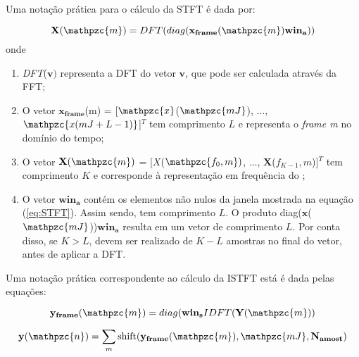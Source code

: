        Uma notação prática para o cálculo da STFT é dada por:


        \begin{equation}\label{eq:practiceSTFT}
            \mathbf{X}(\mathpzc{m})
            = DFT(diag(\mathbf{x_{frame}}(\mathpzc{m})\mathbf{win_a}))
         \end{equation}
         onde 
        \begin{enumerate}
        
            \item \textit{DFT}($\mathbf{v})$ representa a DFT do vetor $\mathbf{v}$, que pode ser calculada através da FFT;
            
            \item O vetor $\mathbf{x_{frame}}$(m) = [$\mathpzc{x}$($\mathpzc{mJ}$), $\dots$, $\mathpzc{x(mJ + L - 1)}$]$^T$ tem comprimento $L$ e representa o \textit{frame m} no domínio do tempo;
            
            \item O vetor $\mathbf{X}(\mathpzc{m})$ = [${X}$($\mathpzc{f_0,m})$, $\dots$, $\mathbf{X}$(${f_{K-1},m}$)]$^T$ tem comprimento $K$ e corresponde à representação em
            frequência do ;
            
            \item O vetor $\mathbf{win_a}$ contém os elementos não nulos da janela mostrada na equação (\ref{eq:STFT}). Assim sendo, tem comprimento $L$. O produto diag($\mathbf{x}$($\mathpzc{mJ}$))$\mathbf{win_a}$ resulta em um vetor de comprimento $L$. Por conta disso, se $K>L$, devem ser realizado  de $K-L$ amostras no final do vetor, antes de aplicar a DFT.
        
        \end{enumerate}
        
        Uma notação prática correspondente ao cálculo da ISTFT está é dada pelas equações:
        
        \begin{equation}\label{eq:practiceISTFT}
            \mathbf{y_{frame}}(\mathpzc{m})
            = diag(\mathbf{win_s}IDFT(\mathbf{Y}(\mathpzc{m}))
         \end{equation}
        
        \begin{equation}\label{eq:practiceISTFT2}
            \mathbf{y}(\mathpzc{n})
            = \sum_{m}\text{shift}(\mathbf{y_{frame}}(\mathpzc{m}),\mathpzc{mJ},\mathbf{N_{amost}})
         \end{equation}
        
